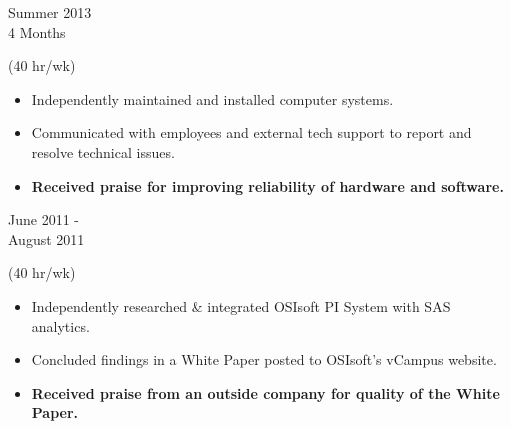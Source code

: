 
\flushleft \begin{minipage}[t]{\dateColWidth}
Summer 2013 \\
4 Months
\end{minipage}
\begin{minipage}[t]{0.8\textwidth}
 (40 hr/wk) \\[-1 em]
\begin{adjustwidth}{2.5 em}{0 em}

\begin{itemize} \itemsep-2pt
\setlength{\itemindent}{-2 em}

\item Independently maintained and installed computer systems.
\item Communicated with employees and external tech support to report and resolve technical issues.
\item\textbf{Received praise for improving reliability of hardware and software.}

\end{itemize}
\end{adjustwidth}
\end{minipage}

\divLine

\flushleft \begin{minipage}[t]{\dateColWidth}
June 2011 - \\[0.2 em]
August 2011
\end{minipage}
\begin{minipage}[t]{0.8\textwidth}
 (40 hr/wk) \\[-1 em]
\begin{adjustwidth}{2.5 em}{0 em} 

\begin{itemize} \itemsep-2pt
\setlength{\itemindent}{-2 em}

\item Independently researched \& integrated OSIsoft PI System with SAS analytics.
\item Concluded findings in a White Paper posted to OSIsoft's vCampus website.
\item\textbf{Received praise from an outside company for quality of the White Paper.}
\end{itemize}

\end{adjustwidth}
\end{minipage}

